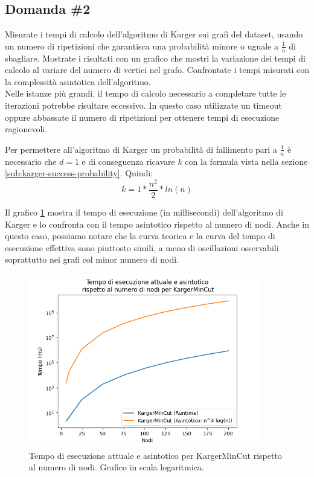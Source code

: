 \subsection{Domanda \#2}
\label{sec:question-2}

\begin{displayquote}
Misurate i tempi di calcolo dell'algoritmo di Karger sui grafi del
dataset, usando un numero di ripetizioni che garantisca una
probabilità minore o uguale a $\frac{1}{n}$ di sbagliare. Mostrate i
risultati con un grafico che mostri la variazione dei tempi di calcolo
al variare del numero di vertici nel grafo. Confrontate i tempi
misurati con la complessità asintotica dell'algoritmo. \\

\noindent Nelle istanze più grandi, il tempo di calcolo necessario a
completare tutte le iterazioni potrebbe risultare eccessivo. In questo
caso utilizzate un timeout oppure abbassate il numero di ripetizioni
per ottenere tempi di esecuzione ragionevoli.
\end{displayquote}

\noindent Per permettere all'algoritmo di Karger un probabilità di
fallimento pari a $\frac{1}{n}$ è necessario che $d = 1$ e di
conseguenza ricavare $k$ con la formula vista nella sezione
\ref{sub:karger-success-probability}. Quindi:
$$ k = 1 * \frac{n^2}{2} * ln(n)$$

\noindent Il grafico \ref{fig:karger-runtime-chart} mostra il tempo di
esecuzione (in millisecondi) dell'algoritmo di Karger e lo confronta con il tempo asintotico rispetto al numero di nodi. Anche in questo caso, possiamo notare che la curva teorica e la curva del tempo di esecuzione effettiva sono piuttosto simili, a meno di oscillazioni osservabili soprattutto nei grafi col minor numero di nodi.

\begin{figure}[H]
    \centering

    \includegraphics[width=0.9\textwidth]{./images/Tempo_di_esecuzione_attuale_e_asintotico__rispetto_al_numero_di_nodi_per_KargerMinCut.png}

    \caption{Tempo di esecuzione attuale e asintotico per KargerMinCut rispetto al numero di nodi. Grafico in scala logaritmica.}
    \label{fig:karger-runtime-chart}
\end{figure}

